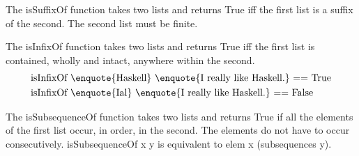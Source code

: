 The isSuffixOf function takes two lists and returns True iff the first list is a suffix of the second. The second list must be finite.

The isInfixOf function takes two lists and returns True iff the first list is contained, wholly and intact, anywhere within the second.
\begin{align*}
	&\text{isInfixOf \enquote{Haskell} \enquote{I really like Haskell.} == True}\\
	&\text{isInfixOf \enquote{Ial} \enquote{I really like Haskell.} == False}
\end{align*}

The isSubsequenceOf function takes two lists and returns True if all the elements of the first list occur, in order, in the second. The elements do not have to occur consecutively.
isSubsequenceOf x y is equivalent to elem x (subsequences y).